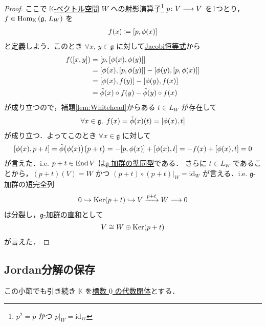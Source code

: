 \documentclass[rep_main]{subfiles}
\begin{document}
\begin{proof}
	ここで \underline{$\mathbb{K}$-ベクトル空間} $W$ への射影演算子\footnote{$p^2 = p$ かつ $p|_W = \mathrm{id}_W$} $p \colon V \longrightarrow V$ を1つとり，$f \in \mathrm{Hom}_{\mathbb{K}} \mathop{}(\mathfrak{g},\, L_W)$ を
	\begin{align}
		f(x) \coloneqq \comm{p}{\phi(x)}
	\end{align}
	と定義しよう．このとき $\forall x,\, y \in \mathfrak{g}$ に対して\hyperref[ax:LieAlg]{Jacobi恒等式}から
	\begin{align}
		f(\comm{x}{y})
		&= \comm{p}{\comm{\phi(x)}{\phi(y)}} \\
		&= \comm{\phi(x)}{\comm{p}{\phi(y)}} - \comm{\phi(y)}{\comm{p}{\phi(x)}} \\
		&= \comm{\phi(x)}{f(y)} - \comm{\phi(y)}{f(x)} \\
		&= \tilde{\phi}(x) \circ f(y) - \tilde{\phi}(y) \circ f(x)
	\end{align}
	が成り立つので，補題\ref{lem:Whitehead}からある $t \in L_W$ が存在して
	\begin{align}
		\forall x \in \mathfrak{g},\; f(x) = \tilde{\phi}(x)(t) = \comm{\phi(x)}{t}
	\end{align}
	が成り立つ．よってこのとき $\forall x \in \mathfrak{g}$ に対して
	\begin{align}
		\comm{\phi(x)}{p+t} = \tilde{\phi}\bigl(\phi(x)\bigr)\bigl( p+t \bigr) = - \comm{p}{\phi(x)} + \comm{\phi(x)}{t} = -f(x) + \comm{\phi(x)}{t} = 0
	\end{align}
	が言えた．i.e. $p+t \in \operatorname{End} V$ は\hyperref[def:g-module-hom]{$\mathfrak{g}$-加群の準同型}である．
	さらに $t \in L_W$ であることから，$(p+t)(V) = W$ かつ $(p+t) \circ (p+t)|_W = \mathrm{id}_W$ が言える．i.e. $\mathfrak{g}$-加群の短完全列
	\begin{align}
		0 \hookrightarrow \operatorname{Ker} (p+t) \hookrightarrow V \xrightarrow{p+t} W \longrightarrow 0
	\end{align}
	は\hyperref[prop:split]{分裂}し，\hyperref[def:gmod-directsum]{$\mathfrak{g}$-加群の直和}として
	\begin{align}
		V \cong W \oplus \operatorname{Ker} (p+t)
	\end{align}
	が言えた．
\end{proof}



\subsection{Jordan分解の保存}

この小節でも引き続き $\mathbb{K}$ を\underline{標数 $0$ の代数閉体}とする．
\end{document}
